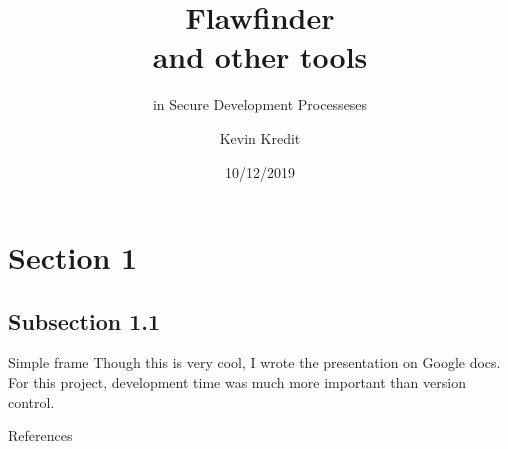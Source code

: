 \documentclass{beamer}
\title{Flawfinder \\ and other tools}
\subtitle{in Secure Development Processeses}
\author{Kevin Kredit}
\institute{GVSU \\ CIS 618}
\date{10/12/2019}
\begin{document}
  \begin{frame}
    \maketitle
  \end{frame}



\section{Section 1}

\subsection{Subsection 1.1}
  \begin{frame}{Simple frame}
    Though this is very cool, I wrote the presentation on Google docs. For this project, development
    time was much more important than version control.
  \end{frame}

\appendix
  \begin{frame}{References}
    \nocite{*}
    
    
  \end{frame}
\end{document}
